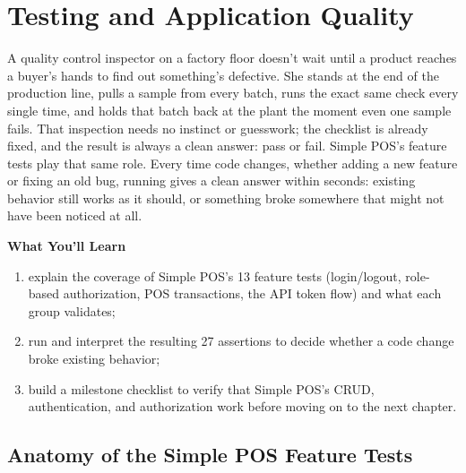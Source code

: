 
\chapter{Testing and Application Quality}
\label{ch:pengujian-aplikasi}


A quality control inspector on a factory floor doesn't wait until a
product reaches a buyer's hands to find out something's defective. She
stands at the end of the production line, pulls a sample from every
batch, runs the exact same check every single time, and holds that
batch back at the plant the moment even one sample fails. That
inspection needs no instinct or guesswork; the checklist is already
fixed, and the result is always a clean answer: pass or fail. Simple
POS's feature tests play that same role. Every time code changes,
whether adding a new feature or fixing an old bug, running  gives a clean answer within seconds: existing behavior
still works as it should, or something broke somewhere that might not
have been noticed at all.

\textbf{What You'll Learn}

\begin{enumerate}
  \item explain the coverage of Simple POS's 13 feature tests (login/logout, role-based authorization, POS transactions, the API token flow) and what each group validates;
  \item run  and interpret the resulting 27 assertions to decide whether a code change broke existing behavior;
  \item build a milestone checklist to verify that Simple POS's CRUD, authentication, and authorization work before moving on to the next chapter.
\end{enumerate}

\section{Anatomy of the Simple POS Feature Tests}
\label{sec:pengujian-aplikasi-1}

